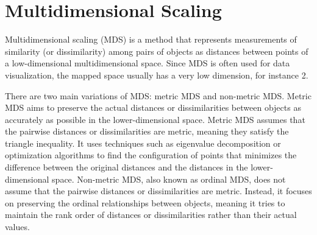 \section{Multidimensional Scaling\label{Sec:DR:MDS}}
Multidimensional scaling (MDS) is a method that represents measurements of similarity (or dissimilarity) among pairs of objects as distances between points of a low-dimensional multidimensional space. Since MDS is often used for data visualization, the mapped space usually has a very low dimension, for instance 2.

There are two main variations of MDS: metric MDS and non-metric MDS. Metric MDS aims to preserve the actual distances or dissimilarities between objects as accurately as possible in the lower-dimensional space. Metric MDS assumes that the pairwise distances or dissimilarities are metric, meaning they satisfy the triangle inequality. It uses techniques such as eigenvalue decomposition or optimization algorithms to find the configuration of points that minimizes the difference between the original distances and the distances in the lower-dimensional space. Non-metric MDS, also known as ordinal MDS, does not assume that the pairwise distances or dissimilarities are metric. Instead, it focuses on preserving the ordinal relationships between objects, meaning it tries to maintain the rank order of distances or dissimilarities rather than their actual values.
